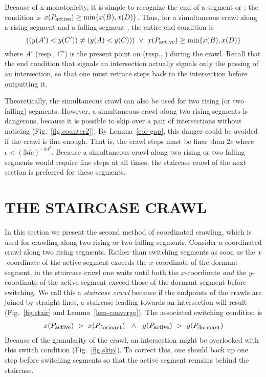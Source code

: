 Because of x-monotonicity, it is simple to recognize the end of a segment 
or : 
the condition is $x(P_{\mbox{\footnotesize{active}}}) \geq \mbox{min} \{x(B),x(D)\}$.
Thus, for a simultaneous crawl along a rising segment  and a falling segment ,
the entire end condition is 
\[ ((y(A') < y(C')) \neq (y(A) < y(C))) \ \vee \ 
x(P_{\mbox{\footnotesize{active}}}) \geq \mbox{min} \{x(B),x(D)\} \]
where $A'$ (resp., $C'$) is the present point on \arc{AB} (resp., ) during the crawl.
Recall that the end condition that signals an intersection actually signals only the 
passing of an 
intersection, so that one must retrace steps back to the intersection before outputting it.

Theoretically, the simultaneous crawl can also be used for two rising (or two falling) segments.
However, a simultaneous crawl along two rising segments is dangerous, 
because it is possible to skip over a pair of intersections without noticing 
(Fig.~\ref{fig.counter2}).
By Lemma~\ref{cor-gap}, this danger could be avoided if the crawl is fine enough.
That is, the crawl steps must be finer than $2\epsilon$ where 
$\epsilon < (3dc)^{-2d^{2}}$.
Because a simultaneous crawl along two rising or two falling
segments would require fine steps at all 
times, the staircase crawl of the next section is preferred for these segments.


\section{THE STAIRCASE CRAWL}
\label{sec-stair}

In this section we present the second method of coordinated crawling, 
which is used for crawling along two rising or two falling segments.
Consider a coordinated crawl along two rising segments.
Rather than switching segments as soon as the $x$-coordinate of the active segment exceeds
the $x$-coordinate of the dormant segment,
in the staircase crawl one waits until both the $x$-coordinate {\em and} the 
$y$-coordinate of the active
segment exceed those of the dormant segment before switching.
We call this a {\em staircase crawl} because if the 
endpoints of the crawls are joined by straight lines, a staircase leading towards an intersection
will result (Fig.~\ref{fig.stair} and Lemma~\ref{lem-converge}).
The associated switching condition is
\begin{eqnarray*}
	x(P_{\mbox{\footnotesize{active}}}) \  > \ 
	x(P_{\mbox{\footnotesize{dormant}}}) \ \ \wedge \ \ 
	y(P_{\mbox{\footnotesize{active}}}) \ > \ 
	y(P_{\mbox{\footnotesize{dormant}}})
\end{eqnarray*}
Because of the granularity of the crawl, an intersection might be overlooked with this switch
condition (Fig.~\ref{fig.skip}).
To correct this, one should back up one step before switching segments so that the active 
segment remains behind the staircase.

